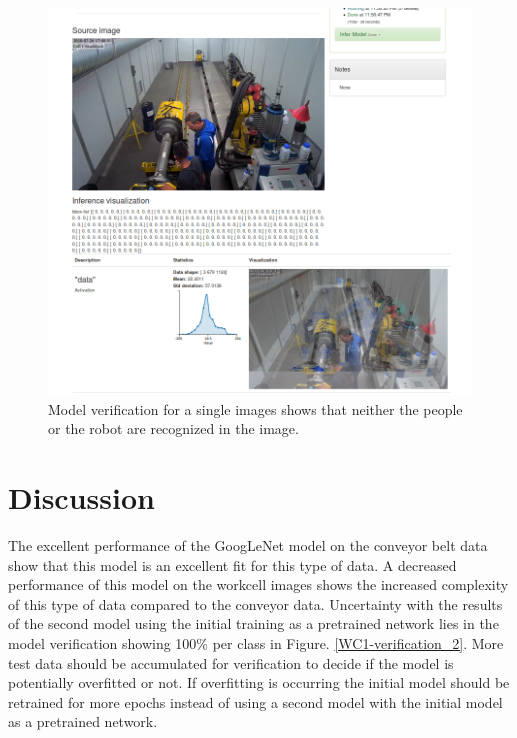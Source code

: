 \documentclass[10pt,journal,compsoc]{IEEEtran}
\begin{document}
\begin{figure}[thpb]
  \centering
  \includegraphics[width=\linewidth]{../img/Workcell2-Object-Detection/model/Workcell2-detectNet-ModelVerification01.png}
  \caption{Model verification for a single images shows that neither the people or the robot are recognized in the image.}
  \label{WC2-model-verif}
\end{figure}


\section{Discussion}
\label{sec:discussion}

The excellent performance of the GoogLeNet model on the conveyor belt data show that this model is an excellent fit for this type of data. A decreased performance of this model on the workcell images shows the increased complexity of this type of data compared to the conveyor data. Uncertainty with the results of the second model using the initial training as a pretrained network lies in the model verification showing 100\% per class in Figure. \ref{WC1-verification_2}. More test data should be accumulated for verification to decide if the model is potentially overfitted or not. If overfitting is occurring the initial model should be retrained for more epochs instead of using a second model with the initial model as a pretrained network.
\end{document}
